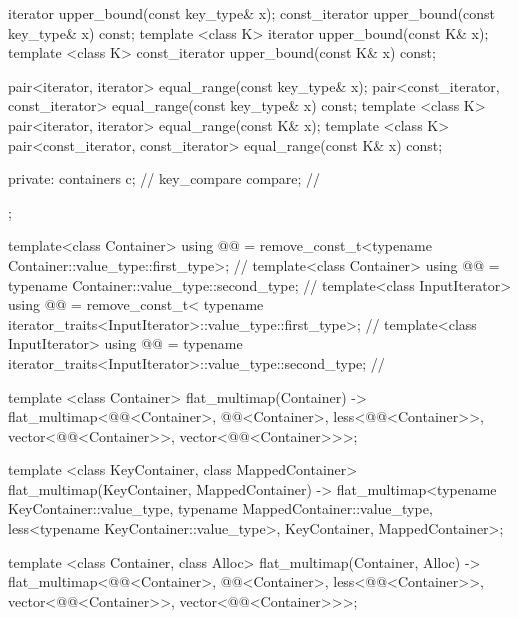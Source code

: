 \begin{codeblock}
\begin{codeblock}
\begin{codeblock}
\begin{addedblock}
\begin{codeblock}
{{      iterator upper_bound(const key_type& x);
      const_iterator upper_bound(const key_type& x) const;
      template <class K> iterator upper_bound(const K& x);
      template <class K> const_iterator upper_bound(const K& x) const;

      pair<iterator, iterator> equal_range(const key_type& x);
      pair<const_iterator, const_iterator> equal_range(const key_type& x) const;
      template <class K>
        pair<iterator, iterator> equal_range(const K& x);
      template <class K>
        pair<const_iterator, const_iterator> equal_range(const K& x) const;

  private:
    containers c;        // \expos
    key_compare compare; // \expos
  };

  template<class Container>
    using @@ =
      remove_const_t<typename Container::value_type::first_type>;          // \expos
  template<class Container>
    using @@ =
      typename Container::value_type::second_type;                        // \expos
  template<class InputIterator>
    using @@ = remove_const_t<
      typename iterator_traits<InputIterator>::value_type::first_type>;   // \expos
  template<class InputIterator>
    using @@ =
      typename iterator_traits<InputIterator>::value_type::second_type;   // \expos

  template <class Container>
    flat_multimap(Container)
      -> flat_multimap<@@<Container>, @@<Container>,
                       less<@@<Container>>,
                       vector<@@<Container>>,
                       vector<@@<Container>>>;

  template <class KeyContainer, class MappedContainer>
    flat_multimap(KeyContainer, MappedContainer)
      -> flat_multimap<typename KeyContainer::value_type,
                       typename MappedContainer::value_type,
                       less<typename KeyContainer::value_type>,
                       KeyContainer, MappedContainer>;

  template <class Container, class Alloc>
    flat_multimap(Container, Alloc)
      -> flat_multimap<@@<Container>, @@<Container>,
                       less<@@<Container>>,
                       vector<@@<Container>>,
                       vector<@@<Container>>>;

}
\end{codeblock}
\end{addedblock}
\end{codeblock}
\end{codeblock}
\end{codeblock}
